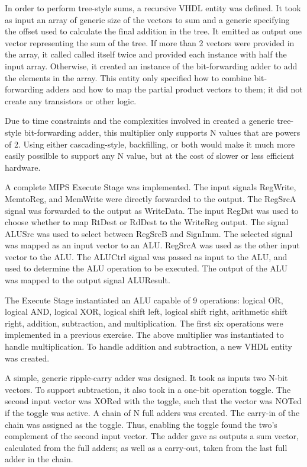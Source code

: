 \documentclass[CMPE]{KGCOEReport}
\begin{document}
In order to perform tree-style sums, a recursive VHDL entity was defined. It
took as input an array of generic size of the vectors to sum and a generic
specifying the offset used to calculate the final addition in the tree. It
emitted as output one vector representing the sum of the tree. If more than 2
vectors were provided in the array, it called called itself twice and provided
each instance with half the input array. Otherwise, it created an instance of
the bit-forwarding adder to add the elements in the array. This entity only
specified how to combine bit-forwarding adders and how to map the partial
product vectors to them; it did not create any transistors or other logic.

Due to time constraints and the complexities involved in created a generic
tree-style bit-forwarding adder, this multiplier only supports N values that
are powers of 2. Using either cascading-style, backfilling, or both would make
it much more easily possilble to support any N value, but at the cost of slower
or less efficient hardware.

A complete MIPS Execute Stage was implemented. The input signals RegWrite,
MemtoReg, and MemWrite were directly forwarded to the output. The RegSrcA
signal was forwarded to the output as WriteData. The input RegDst was used to
choose whether to map RtDest or RdDest to the WriteReg output. The signal
ALUSrc was used to select between RegSrcB and SignImm. The selected signal was
mapped as an input vector to an ALU. RegSrcA was used as the other input vector
to the ALU. The ALUCtrl signal was passed as input to the ALU, and used to
determine the ALU operation to be executed. The output of the ALU was mapped
to the output signal ALUResult.

The Execute Stage instantiated an ALU capable of 9 operations: logical OR,
logical AND, logical XOR, logical shift left, logical shift right, arithmetic
shift right, addition, subtraction, and multiplication. The first six
operations were implemented in a previous exercise. The above multiplier was
instantiated to handle multiplication. To handle addition and subtraction, a
new VHDL entity was created.

A simple, generic ripple-carry adder was designed. It took as inputs two N-bit
vectors. To support subtraction, it also took in a one-bit operation toggle.
The second input vector was XORed with the toggle, such that the vector was
NOTed if the toggle was active. A chain of N full adders was created. The
carry-in of the chain was assigned as the toggle. Thus, enabling the toggle
found the two's complement of the second input vector. The adder gave as
outputs a sum vector, calculated from the full adders; as well as a
carry-out, taken from the last full adder in the chain.
\end{document}
